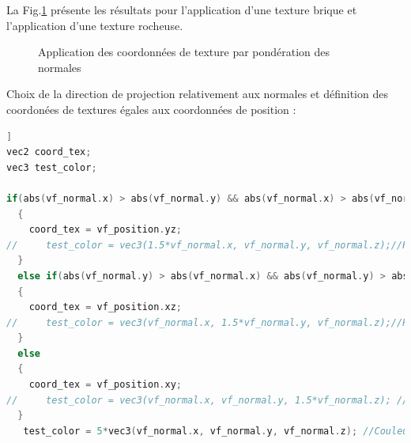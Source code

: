 \documentclass[a4paper]{article}
\begin{document}
La Fig.\ref{normalestextures} présente les résultats pour l'application d'une texture brique et l'application d'une texture rocheuse. 
\begin{figure}[H]
\centering
{}
\caption{Application des coordonnées de texture par pondération des normales}
\label{normalestextures}
\end{figure}


Choix de la direction de projection relativement aux normales et définition des coordonées de textures égales aux coordonnées de position : 

\begin{lstlisting}[language=C++,
                   directivestyle={\color{black}}
                   emph={int,char,double,float,unsigned},
                   emphstyle={\color{blue}}]]
vec2 coord_tex;
vec3 test_color;

if(abs(vf_normal.x) > abs(vf_normal.y) && abs(vf_normal.x) > abs(vf_normal.z))
  {
    coord_tex = vf_position.yz;
//     test_color = vec3(1.5*vf_normal.x, vf_normal.y, vf_normal.z);//Ponderation de la couleur selon la direction principale pour un rendu plus naturel
  }
  else if(abs(vf_normal.y) > abs(vf_normal.x) && abs(vf_normal.y) > abs(vf_normal.z))
  {
    coord_tex = vf_position.xz;
//     test_color = vec3(vf_normal.x, 1.5*vf_normal.y, vf_normal.z);//Ponderation de la couleur selon la direction principale pour un rendu plus naturel
  }
  else
  {
    coord_tex = vf_position.xy;
//     test_color = vec3(vf_normal.x, vf_normal.y, 1.5*vf_normal.z); //Ponderation de la couleur selon la direction principale pour un rendu plus naturel
  }
   test_color = 5*vec3(vf_normal.x, vf_normal.y, vf_normal.z); //Couleur melangeant les 3 vues des normales 
                   
\end{lstlisting}
\end{document}
